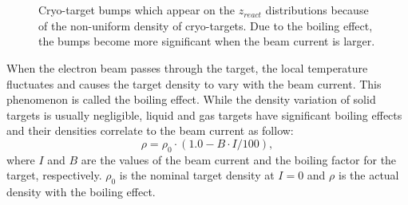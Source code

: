 \begin{figure}[!ht]
  \begin{center}
    \\
    \\
    \caption[Cryo-target bumps]{\footnotesize{Cryo-target bumps which appear on the $z_{react}$ distributions because of the non-uniform density of cryo-targets. Due to the boiling effect, the bumps become more significant when the beam current is larger.}}
    \label{bump_current}
  \end{center}
\end{figure}
 When the electron beam passes through the target, the local temperature fluctuates and causes the target density to vary with the beam current. This phenomenon is called the boiling effect. While the density variation of solid targets is usually negligible, liquid and gas targets have significant boiling effects and their densities correlate to the beam current as follow:
\begin{equation}
  \rho = \rho_{0} \cdot (1.0 - B \cdot I /100),
  \label{eq_tgrho}
\end{equation}
where $I$ and $B$ are the values of the beam current and the boiling factor for the target, respectively. $\rho_{0}$ is the nominal target density at $I=0$ and $\rho$ is the actual density with the boiling effect.

